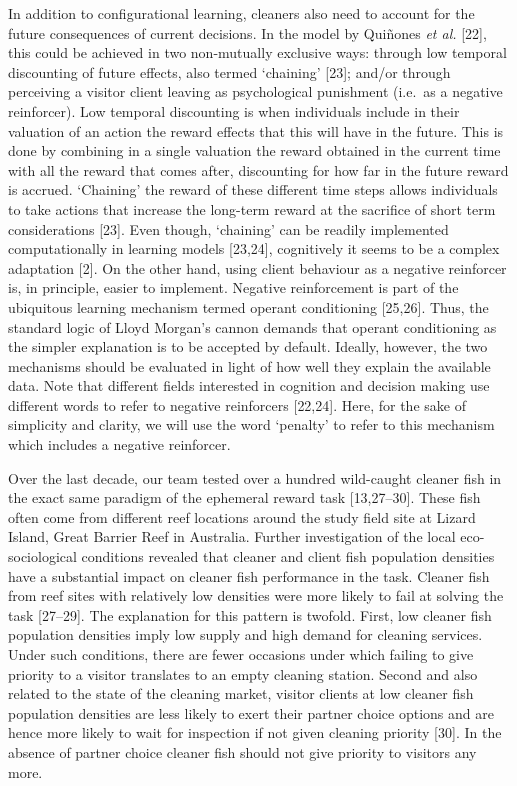 \documentclass[10pt,letterpaper]{article}
\begin{document}
In addition to configurational learning, cleaners also need to account
for the future consequences of current decisions. In the model by
Quiñones \emph{et al.} {[}22{]}, this could be achieved in two
non-mutually exclusive ways: through low temporal discounting of future
effects, also termed `chaining' {[}23{]}; and/or through perceiving a
visitor client leaving as psychological punishment (i.e.~as a negative
reinforcer). Low temporal discounting is when individuals include in
their valuation of an action the reward effects that this will have in
the future. This is done by combining in a single valuation the reward
obtained in the current time with all the reward that comes after,
discounting for how far in the future reward is accrued. `Chaining' the
reward of these different time steps allows individuals to take actions
that increase the long-term reward at the sacrifice of short term
considerations {[}23{]}. Even though, `chaining' can be readily
implemented computationally in learning models {[}23,24{]}, cognitively
it seems to be a complex adaptation {[}2{]}. On the other hand, using
client behaviour as a negative reinforcer is, in principle, easier to
implement. Negative reinforcement is part of the ubiquitous learning
mechanism termed operant conditioning {[}25,26{]}. Thus, the standard
logic of Lloyd Morgan's cannon demands that operant conditioning as the
simpler explanation is to be accepted by default. Ideally, however, the
two mechanisms should be evaluated in light of how well they explain the
available data. Note that different fields interested in cognition and
decision making use different words to refer to negative reinforcers
{[}22,24{]}. Here, for the sake of simplicity and clarity, we will use
the word `penalty' to refer to this mechanism which includes a negative
reinforcer.

Over the last decade, our team tested over a hundred wild-caught cleaner
fish in the exact same paradigm of the ephemeral reward task
{[}13,27--30{]}. These fish often come from different reef locations
around the study field site at Lizard Island, Great Barrier Reef in
Australia. Further investigation of the local eco-sociological
conditions revealed that cleaner and client fish population densities
have a substantial impact on cleaner fish performance in the task.
Cleaner fish from reef sites with relatively low densities were more
likely to fail at solving the task {[}27--29{]}. The explanation for
this pattern is twofold. First, low cleaner fish population densities
imply low supply and high demand for cleaning services. Under such
conditions, there are fewer occasions under which failing to give
priority to a visitor translates to an empty cleaning station. Second
and also related to the state of the cleaning market, visitor clients at
low cleaner fish population densities are less likely to exert their
partner choice options and are hence more likely to wait for inspection
if not given cleaning priority {[}30{]}. In the absence of partner
choice cleaner fish should not give priority to visitors any more.
\end{document}
